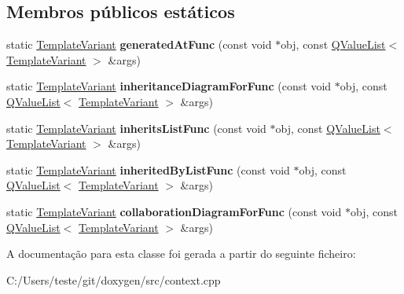 \subsection*{Membros públicos estáticos}
\begin{DoxyCompactItemize}
\item 
\hypertarget{class_translate_context_1_1_private_a91c05918ec79db798dcaf837b7114fa1}{static \hyperlink{class_template_variant}{Template\-Variant} {\bfseries generated\-At\-Func} (const void $\ast$obj, const \hyperlink{class_q_value_list}{Q\-Value\-List}$<$ \hyperlink{class_template_variant}{Template\-Variant} $>$ \&args)}\label{class_translate_context_1_1_private_a91c05918ec79db798dcaf837b7114fa1}

\item 
\hypertarget{class_translate_context_1_1_private_afd4e769851c970ceadd74ad5b531153f}{static \hyperlink{class_template_variant}{Template\-Variant} {\bfseries inheritance\-Diagram\-For\-Func} (const void $\ast$obj, const \hyperlink{class_q_value_list}{Q\-Value\-List}$<$ \hyperlink{class_template_variant}{Template\-Variant} $>$ \&args)}\label{class_translate_context_1_1_private_afd4e769851c970ceadd74ad5b531153f}

\item 
\hypertarget{class_translate_context_1_1_private_a2458923814c61223b2670c95dd2d9559}{static \hyperlink{class_template_variant}{Template\-Variant} {\bfseries inherits\-List\-Func} (const void $\ast$obj, const \hyperlink{class_q_value_list}{Q\-Value\-List}$<$ \hyperlink{class_template_variant}{Template\-Variant} $>$ \&args)}\label{class_translate_context_1_1_private_a2458923814c61223b2670c95dd2d9559}

\item 
\hypertarget{class_translate_context_1_1_private_ad6ee37a22b8a27738898f6a30a08a5ea}{static \hyperlink{class_template_variant}{Template\-Variant} {\bfseries inherited\-By\-List\-Func} (const void $\ast$obj, const \hyperlink{class_q_value_list}{Q\-Value\-List}$<$ \hyperlink{class_template_variant}{Template\-Variant} $>$ \&args)}\label{class_translate_context_1_1_private_ad6ee37a22b8a27738898f6a30a08a5ea}

\item 
\hypertarget{class_translate_context_1_1_private_ad4fc97c30e8bb15f3e68d26e0550aed3}{static \hyperlink{class_template_variant}{Template\-Variant} {\bfseries collaboration\-Diagram\-For\-Func} (const void $\ast$obj, const \hyperlink{class_q_value_list}{Q\-Value\-List}$<$ \hyperlink{class_template_variant}{Template\-Variant} $>$ \&args)}\label{class_translate_context_1_1_private_ad4fc97c30e8bb15f3e68d26e0550aed3}

\end{DoxyCompactItemize}


A documentação para esta classe foi gerada a partir do seguinte ficheiro\-:\begin{DoxyCompactItemize}
\item 
C\-:/\-Users/teste/git/doxygen/src/context.\-cpp\end{DoxyCompactItemize}
